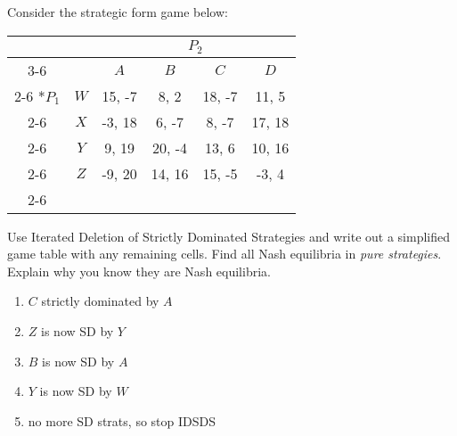 \documentclass{article}
\begin{document}
\begin{question}%
Consider the strategic form game below:
\begin{table}[!h]
  \begin{center}
    \begin{tabular}{*{6}{c|}}
      \multicolumn{2}{c}{} & \multicolumn{4}{c}{$P_2$} \\ \cline{3-6}
      \multicolumn{1}{c}{} &  & $A$ & $B$ & $C$ & $D$ \\ \cline{2-6} 
      \multirow{4}*{$P_1$}
      & $W$ & 15, -7 &  8,  2 & 18, -7 & 11,  5 \\ \cline{2-6}
      & $X$ & -3, 18 &  6, -7 &  8, -7 & 17, 18 \\ \cline{2-6} 
      & $Y$ &  9, 19 & 20, -4 & 13,  6 & 10, 16 \\ \cline{2-6} 
      & $Z$ & -9, 20 & 14, 16 & 15, -5 & -3,  4 \\ \cline{2-6} 
  \end{tabular}
  \end{center}
\end{table}
\begin{tasks}
  \task 
  Use Iterated Deletion of Strictly Dominated Strategies
  and write out a simplified game table with any remaining cells.
  \task
  Find all Nash equilibria in \textit{pure strategies}.
  Explain why you know they are Nash equilibria.
\end{tasks}
\begin{solution}
  \begin{tasks}
    \task
    \begin{enumerate}
      \item $C$ strictly dominated by $A$
      \item $Z$ is now SD by $Y$
      \item $B$ is now SD by $A$
      \item $Y$ is now SD by $W$
      \item no more SD strats, so stop IDSDS

\end{enumerate}
\end{tasks}
\end{solution}
\end{question}
\end{document}
